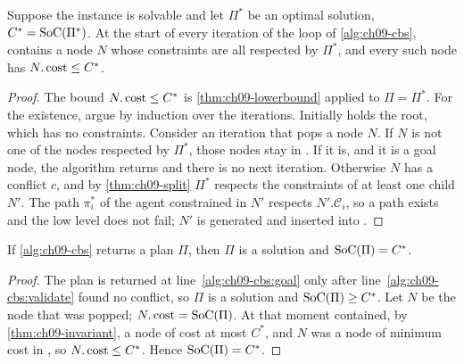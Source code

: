 \begin{lemma}
\label{thm:ch09-invariant}
Suppose the instance is solvable and let $\Pi^*$ be an optimal solution,
$C^* = \mathrm{SoC}(\Pi^*)$. At the start of every iteration of the loop of
\cref{alg:ch09-cbs}, \Open contains a node $N$ whose constraints are all
respected by $\Pi^*$, and every such node has $N.\operatorname{cost} \le C^*$.
\end{lemma}
\begin{proof}
The bound $N.\operatorname{cost} \le C^*$ is \cref{thm:ch09-lowerbound} applied to
$\Pi = \Pi^*$. For the existence, argue by induction over the iterations.
Initially \Open holds the root, which has no constraints. Consider an
iteration that pops a node $N$. If $N$ is not one of the nodes respected by
$\Pi^*$, those nodes stay in \Open. If it is, and it is a goal node, the
algorithm returns and there is no next iteration. Otherwise $N$ has a
conflict $c$, and by \cref{thm:ch09-split} $\Pi^*$ respects the constraints
of at least one child $N'$. The path $\pi_i^*$ of the agent constrained in
$N'$ respects $N'.\mathcal{C}_i$, so a path exists and the low level does
not fail; $N'$ is generated and inserted into \Open. \qedhere
\end{proof}

\begin{theorem}
\label{thm:ch09-optimal}
If \cref{alg:ch09-cbs} returns a plan $\Pi$, then $\Pi$ is a solution and
$\mathrm{SoC}(\Pi) = C^*$.
\end{theorem}
\begin{proof}
The plan is returned at line~\ref{alg:ch09-cbs:goal} only after
line~\ref{alg:ch09-cbs:validate} found no conflict, so $\Pi$ is a solution
and $\mathrm{SoC}(\Pi) \ge C^*$. Let $N$ be the node that was popped; $N.\operatorname{cost} =
\mathrm{SoC}(\Pi)$. At that moment \Open contained, by
\cref{thm:ch09-invariant}, a node of cost at most $C^*$, and $N$ was a node
of minimum cost in \Open, so $N.\operatorname{cost} \le C^*$. Hence
$\mathrm{SoC}(\Pi) = C^*$. \qedhere
\end{proof}

